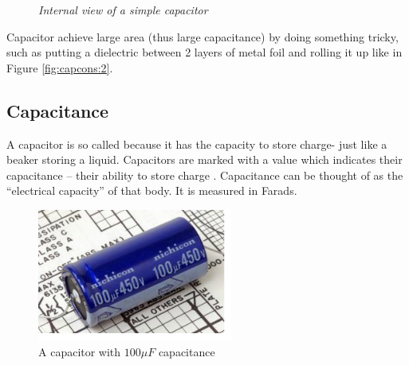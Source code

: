 		\begin{figure}[ht]
			\centering 
			\hfill
			\caption{\textit{Internal view of a simple capacitor}}
		\end{figure}
	
		Capacitor achieve large area (thus large capacitance) by doing something tricky, such as putting a dielectric between 2 layers of metal foil and rolling it up like in Figure \ref{fig:capcons:2}.

	\subsection{Capacitance}
		A capacitor is so called because it has the capacity to store charge- just like a beaker storing a liquid. Capacitors are marked with a value which indicates their capacitance – their ability to store charge . Capacitance can be thought of as the “electrical capacity” of that body. It is measured in Farads.
		\begin{figure}[h!]
			\centering
			\includegraphics[width=0.5\linewidth]{img/exp2/4}
			\caption[]{A capacitor with $100\mu F$ capacitance}
			\label{fig:cap2}
		\end{figure}
	
